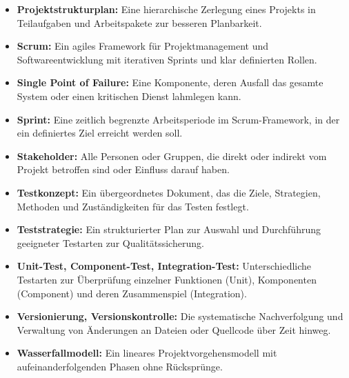 \begin{itemize}
  \item \textbf{Projektstrukturplan:} Eine hierarchische Zerlegung eines Projekts in Teilaufgaben und Arbeitspakete zur besseren Planbarkeit.

  \item \textbf{Scrum:} Ein agiles Framework für Projektmanagement und Softwareentwicklung mit iterativen Sprints und klar definierten Rollen.

  \item \textbf{Single Point of Failure:} Eine Komponente, deren Ausfall das gesamte System oder einen kritischen Dienst lahmlegen kann.

  \item \textbf{Sprint:} Eine zeitlich begrenzte Arbeitsperiode im Scrum-Framework, in der ein definiertes Ziel erreicht werden soll.

  \item \textbf{Stakeholder:} Alle Personen oder Gruppen, die direkt oder indirekt vom Projekt betroffen sind oder Einfluss darauf haben.

  \item \textbf{Testkonzept:} Ein übergeordnetes Dokument, das die Ziele, Strategien, Methoden und Zuständigkeiten für das Testen festlegt.

  \item \textbf{Teststrategie:} Ein strukturierter Plan zur Auswahl und Durchführung geeigneter Testarten zur Qualitätssicherung.

  \item \textbf{Unit-Test, Component-Test, Integration-Test:} Unterschiedliche Testarten zur Überprüfung einzelner Funktionen (Unit), Komponenten (Component) und deren Zusammenspiel (Integration).

  \item \textbf{Versionierung, Versionskontrolle:} Die systematische Nachverfolgung und Verwaltung von Änderungen an Dateien oder Quellcode über Zeit hinweg.

  \item \textbf{Wasserfallmodell:} Ein lineares Projektvorgehensmodell mit aufeinanderfolgenden Phasen ohne Rücksprünge.

\end{itemize} 